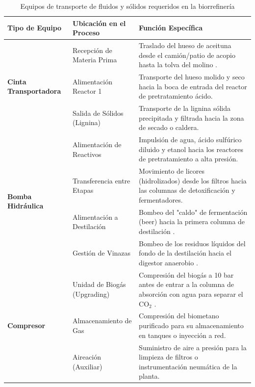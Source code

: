 \documentclass{report}
\begin{document}
\begin{table}[h]
\centering
\begin{tabular}{|l|l|p{6cm}|}
\hline
\textbf{Tipo de Equipo} & \textbf{Ubicación en el Proceso} & \textbf{Función Específica} \\ \hline
\multirow{3}{*}{\textbf{Cinta Transportadora}} 
 & Recepción de Materia Prima & Traslado del hueso de aceituna desde el camión/patio de acopio hasta la tolva del molino . \\ \cline{2-3}
 & Alimentación Reactor 1 & Transporte del hueso molido y seco hacia la boca de entrada del reactor de pretratamiento ácido. \\ \cline{2-3}
 & Salida de Sólidos (Lignina) & Transporte de la lignina sólida precipitada y filtrada hacia la zona de secado o caldera. \\ \hline
\multirow{4}{*}{\textbf{Bomba Hidráulica}} 
 & Alimentación de Reactivos & Impulsión de agua, ácido sulfúrico diluido y etanol hacia los reactores de pretratamiento a alta presión. \\ \cline{2-3}
 & Transferencia entre Etapas & Movimiento de licores (hidrolizados) desde los filtros hacia las columnas de detoxificación y fermentadores. \\ \cline{2-3}
 & Alimentación a Destilación & Bombeo del "caldo" de fermentación (beer) hacia la primera columna de destilación . \\ \cline{2-3}
 & Gestión de Vinazas & Bombeo de los residuos líquidos del fondo de la destilación hacia el digestor anaerobio . \\ \hline
\multirow{3}{*}{\textbf{Compresor}} 
 & Unidad de Biogás (Upgrading) & Compresión del biogás a 10 bar antes de entrar a la columna de absorción con agua para separar el CO$_2$ . \\ \cline{2-3}
 & Almacenamiento de Gas & Compresión del biometano purificado para su almacenamiento en tanques o inyección a red. \\ \cline{2-3}
 & Aireación (Auxiliar) & Suministro de aire a presión para la limpieza de filtros o instrumentación neumática de la planta. \\ \hline
\end{tabular}
\caption{Equipos de transporte de fluidos y sólidos requeridos en la biorrefinería}
\label{tab:equipos_transporte}
\end{table}
\end{document}

